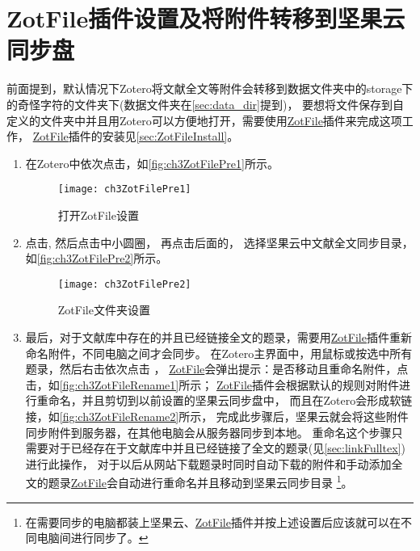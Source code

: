 \documentclass[cn,11pt,chinese]{elegantbook}
\begin{document}
	\section{ZotFile插件设置及将附件转移到坚果云同步盘}\label{sec:zotFilePre}
		前面提到，默认情况下Zotero将文献全文等附件会转移到数据文件夹中的storage下
		的奇怪字符的文件夹下(数据文件夹在\cref{sec:data_dir}提到)，
		要想将文件保存到自定义的文件夹中并且用Zotero可以方便地打开，需要使用\href{http://zotfile.com/}{ZotFile}插件来完成这项工作，
		\href{http://zotfile.com/}{ZotFile}插件的安装见\cref{sec:ZotFileInstall}。
		\begin{enumerate}
			\item 在Zotero中依次点击，如\autoref{fig:ch3ZotFilePre1}所示。
			\begin{figure}[t]
				\centering
				\texttt{[image: ch3ZotFilePre1]}
				\caption{打开ZotFile设置}
				\label{fig:ch3ZotFilePre1}
			\end{figure}
			\item 点击,
			然后点击中小圆圈，
			再点击后面的，
			选择坚果云中文献全文同步目录，如\autoref{fig:ch3ZotFilePre2}所示。
			\begin{figure}[htbp]
				\centering
				\texttt{[image: ch3ZotFilePre2]}
				\caption{ZotFile文件夹设置}
				\label{fig:ch3ZotFilePre2}
			\end{figure}
			\item 最后，对于文献库中存在的并且已经链接全文的题录，需要用\href{http://zotfile.com/}{ZotFile}插件重新命名附件，不同电脑之间才会同步。
			在Zotero主界面中，用鼠标或按选中所有题录，然后右击依次点击
			，
			\href{http://zotfile.com/}{ZotFile}会弹出提示：是否移动且重命名附件，点击，如\autoref{fig:ch3ZotFileRename1}所示；
			\href{http://zotfile.com/}{ZotFile}插件会根据默认的规则对附件进行重命名，并且剪切到以前设置的坚果云同步盘中，
			而且在Zotero会形成软链接，如\autoref{fig:ch3ZotFileRename2}所示，
			完成此步骤后，坚果云就会将这些附件同步附件到服务器，在其他电脑会从服务器同步到本地。
			重命名这个步骤只需要对于已经存在于文献库中并且已经链接了全文的题录(见\cref{sec:linkFulltex})进行此操作，
			对于以后从网站下载题录时同时自动下载的附件和手动添加全文的题录\href{http://zotfile.com/}{ZotFile}会自动进行重命名并且移动到坚果云同步目录
			\footnote{在需要同步的电脑都装上坚果云、\href{http://zotfile.com/}{ZotFile}插件并按上述设置后应该就可以在不同电脑间进行同步了。}。
	



\end{enumerate}
\end{document}
